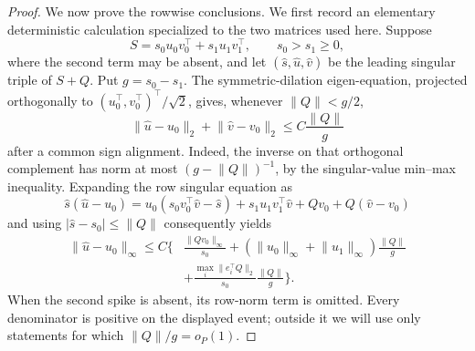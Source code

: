 \documentclass{article}
\begin{document}
\begin{proof}
We now prove the rowwise conclusions.  We first record an elementary deterministic calculation specialized to the two matrices used here.  Suppose
\[
 S=s_0u_0v_0^\top+s_1u_1v_1^\top,
 \qquad s_0>s_1\ge0,
\]
where the second term may be absent, and let \((\widehat s,\widehat u,\widehat v)\) be the leading singular triple of \(S+Q\).  Put \(g=s_0-s_1\).  The symmetric-dilation eigen-equation, projected orthogonally to \((u_0^\top,v_0^\top)^\top/\sqrt2\), gives, whenever \(\lVert Q\rVert<g/2\),
\[
 \lVert\widehat u-u_0\rVert_2+
 \lVert\widehat v-v_0\rVert_2
 \le C\frac{\lVert Q\rVert}{g}
\]
after a common sign alignment.  Indeed, the inverse on that orthogonal complement has norm at most \((g-\lVert Q\rVert)^{-1}\), by the singular-value min--max inequality.  Expanding the row singular equation as
\[
 \widehat s(\widehat u-u_0)
 =u_0(s_0v_0^\top\widehat v-\widehat s)
 +s_1u_1v_1^\top\widehat v+Qv_0+Q(\widehat v-v_0)
\]
and using \(|\widehat s-s_0|\le\lVert Q\rVert\) consequently yields
\[
 \begin{aligned}
 \lVert\widehat u-u_0\rVert_\infty
 \le C\bigg\{&\frac{\lVert Qv_0\rVert_\infty}{s_0}
 +(\lVert u_0\rVert_\infty+\lVert u_1\rVert_\infty)
   \frac{\lVert Q\rVert}{g}\\
 &+\frac{\max_i\lVert e_i^\top Q\rVert_2}{s_0}
   \frac{\lVert Q\rVert}{g}\bigg\}.
 \end{aligned}
\]
When the second spike is absent, its row-norm term is omitted.  Every denominator is positive on the displayed event; outside it we will use only statements for which \(\lVert Q\rVert/g=o_P(1)\).


\end{proof}
\end{document}
